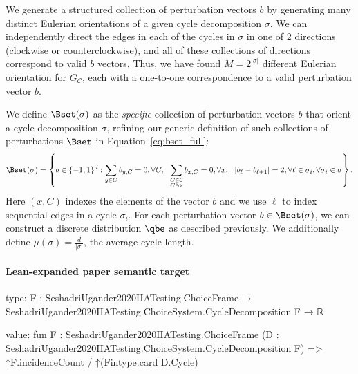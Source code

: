 \documentclass[10pt]{article}
\begin{document}
\begin{ReviewVerbatim}
	We generate a structured collection of perturbation vectors $b$ by generating many distinct Eulerian orientations of a given cycle decomposition $\sigma$. We can independently direct the edges in each of the	cycles in $\sigma$ in one of 2 directions (clockwise or counterclockwise), and all of these collections of directions correspond to valid $b$ vectors. Thus, we have found $M=2^{|\sigma|}$ different Eulerian orientation for $G_\mathcal{C}$, each with a one-to-one correspondence to a valid perturbation vector $b$.

	We define $\Bset(\sigma)$ as the {\it specific} collection of perturbation vectors $b$ that orient a cycle decomposition $\sigma$, refining our generic definition of such collections of perturbations $\Bset$ in Equation~\eqref{eq:bset_full}:
	\begin{align}
	\label{eq:bset}
	\Bset(\sigma) =
	\left \{
	b \in \lbrace -1, 1 \rbrace^d
	:
	\sum_{y \in C} b_{y,C} = 0, \forall C,
	\ \
	\sum_{\substack{C \in \mathcal{C}\\ C \ni x}} b_{x,C} = 0, \forall x,
	\ \
	|b_\ell - b_{\ell+1} | =2, \forall \ell \in \sigma_i,
	\forall \sigma_i \in \sigma
	\right \}.
	\end{align}
	Here $(x,C)$ indexes the elements of the vector $b$ and we use $\ell$ to index sequential edges in a cycle $\sigma_i$. For each perturbation vector $b \in \Bset(\sigma)$, we can construct a discrete distribution $\qbe$ as described previously. We additionally define $\mu(\sigma) = \frac{d}{|\sigma|}$, the average cycle length.
\end{ReviewVerbatim}



\paragraph{Lean-expanded paper semantic target}
\begin{ReviewVerbatim}
type:
{F : SeshadriUgander2020IIATesting.ChoiceFrame} → SeshadriUgander2020IIATesting.ChoiceSystem.CycleDecomposition F → ℝ

value:
fun {F : SeshadriUgander2020IIATesting.ChoiceFrame}
    (D : SeshadriUgander2020IIATesting.ChoiceSystem.CycleDecomposition F) =>
  ↑F.incidenceCount / ↑(Fintype.card D.Cycle)
\end{ReviewVerbatim}
\end{document}
